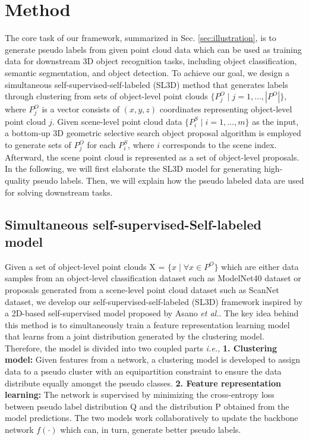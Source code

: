 \documentclass{article}
\begin{document}
\section{Method}
\label{sec:method}
The core task of our framework, summarized in Sec. \ref{sec:illustration}, is to generate pseudo labels from given point cloud data which can be used as training data for downstream 3D object recognition tasks, including object classification, semantic segmentation, and object detection. To achieve our goal, we design a simultaneous self-supervised-self-labeled (SL3D) method that generates labels through clustering from sets of object-level point clouds $\{ P^O_{j} \mid j=1, \dots, |P^O| \}$, {where $P_j^O$ is a vector consists of $(x,y,z)$ coordinates representing object-level point cloud $j$.} Given scene-level point cloud data $\{ P^S_{i} \mid i=1, \dots, m \}$ as the input, a bottom-up 3D geometric selective search object proposal algorithm \cite{ren2021wypr} is employed to generate sets of $P_j^O$ for each $P^S_{i}$, where $i$ corresponds to the scene index. Afterward, the scene point cloud is represented as a set of object-level proposals. In the following, we will first elaborate the SL3D model for generating high-quality pseudo labels. Then, we will explain how the pseudo labeled data are used for solving downstream tasks.

\subsection{Simultaneous self-supervised-Self-labeled model}

Given a set of object-level  point clouds X = $\{ x \mid \forall x \in P^O\}$ which are either data samples from an object-level classification dataset such as ModelNet40 \cite{wu20153d} dataset or proposals generated from a scene-level point cloud dataset such as ScanNet \cite{dai2017scannet} dataset, we develop our self-supervised-self-labeled (SL3D) framework inspired by a 2D-based self-supervised model proposed by Asano \textit{et al.}\cite{asano2020self}. The key idea behind this method is to simultaneously train a feature representation learning model that learns from a joint distribution generated by the clustering model. 
Therefore, the model is divided into two coupled parts \textit{i.e.,} \textbf{1. Clustering model:} Given features from a network, a  clustering model is developed to assign data to a pseudo cluster with an equipartition constraint to ensure the data distribute equally amongst the pseudo classes. \textbf{2. Feature representation learning:} The network is supervised by minimizing the cross-entropy loss between pseudo label distribution Q and the distribution P obtained from the model predictions. The two models work collaboratively to update the backbone network $f(\cdot)$ which can, in turn, generate better pseudo labels.
\end{document}
